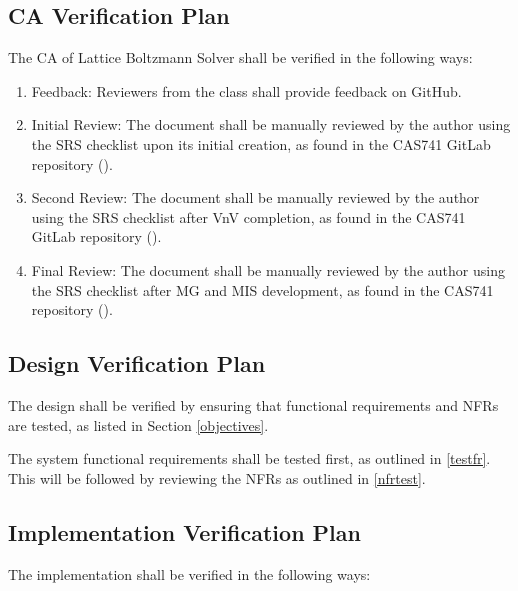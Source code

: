 \documentclass[12pt, titlepage]{article}
\newcommand{\famname}{Lattice Boltzmann Solver}
\begin{document}
\subsection{CA Verification Plan}

The CA of {\famname} shall be verified in the following ways:

\begin{enumerate}
\item Feedback: Reviewers from the class shall provide feedback on GitHub.
\item Initial Review: The document shall be manually reviewed by the author
  using the SRS checklist upon its initial creation, as found in the CAS741
  GitLab repository (\citet{CAS741_SRS_checklist}).
\item Second Review: The document shall be manually reviewed by the author using
  the SRS checklist after VnV completion, as found in the CAS741 GitLab
  repository (\citet{CAS741_SRS_checklist}).
\item Final Review: The document shall be manually reviewed by the author using
  the SRS checklist after MG and MIS development, as found in the CAS741
  repository (\citet{CAS741_SRS_checklist}).
\end{enumerate}

\subsection{Design Verification Plan}

The design shall be verified by ensuring that functional requirements and NFRs
are tested, as listed in Section \ref{objectives}.

\noindent The system functional requirements shall be tested first, as outlined
in \ref{testfr}. This will be followed by reviewing the NFRs as outlined in
\ref{nfrtest}.

\subsection{Implementation Verification Plan}
  
\noindent The implementation shall be verified in the following ways:
\end{document}
